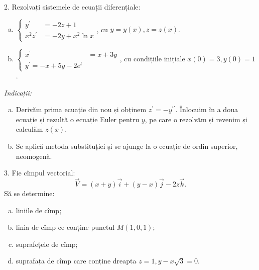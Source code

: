 2. Rezolvați sistemele de ecuații diferențiale:
\begin{enumerate}[(a)]
\item $ \begin{cases}
    y^\prime &= -2z + 1 \\
    x^2 z^\prime &= -2y + x^2 \ln x
  \end{cases} $, cu $ y = y(x), z = z(x) $.
\item $ \begin{cases}
    x^\prime &= x + 3y \\
    y^\prime = -x + 5y - 2e^t
  \end{cases} $, cu condițiile inițiale $ x(0) = 3, y(0) = 1 $.
\end{enumerate}

\emph{Indicații:}
\begin{enumerate}[(a)]
\item Derivăm prima ecuație din nou și obținem $ z^\prime = - y^{\prime\prime} $. Înlocuim în
  a doua ecuație și rezultă o ecuație Euler pentru $ y $, pe care o rezolvăm și revenim și calculăm
  $ z(x) $.
\item Se aplică metoda substituției și se ajunge la o ecuație de ordin superior, neomogenă.
\end{enumerate}

\vspace{1cm}

3. Fie cîmpul vectorial:
\[
  \vec{V} = (x + y)\vec{i} + (y - x)\vec{j} - 2z\vec{k}.
\]
Să se determine:
\begin{enumerate}[(a)]
\item liniile de cîmp;
\item linia de cîmp ce conține punctul $ M(1, 0, 1) $;
\item suprafețele de cîmp;
\item suprafața de cîmp care conține dreapta $ z = 1, y - x\sqrt{3} = 0 $.
\end{enumerate}

